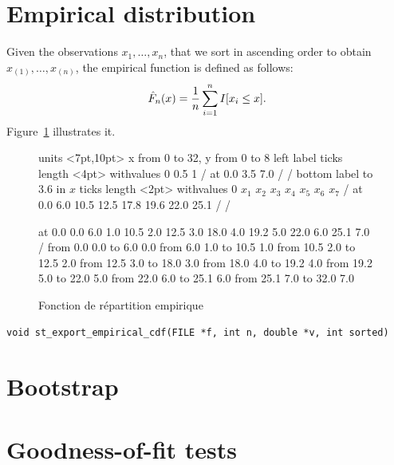 \section{Empirical distribution}

Given the observations ${x_1,\dots,x_n}$, that we sort in ascending
order to obtain ${x_{(1)},\dots,x_{(n)}}$, the empirical function
 is defined as follows:
\[
 {\hat F_n(x)} = {1\over n} \sum_{i=1}^n I[x_i \le x].
\]
Figure~\ref{fig:empirical} illustrates it.
\begin{figure}[htb]
\begin{center}
\beginpicture
\setcoordinatesystem units <7pt,10pt>
\hskip 20pt
\setplotarea x from 0 to 32, y from 0 to 8
\axis left
  label {
         \hskip 6pt } 
  ticks length <4pt> withvalues  0  0.5  1 / at  0.0  3.5  7.0 / /
\axis bottom
  label {\hbox to 3.6 in {\hfill $x$}}
  ticks length <2pt> withvalues  
     0  $x_1$ $x_2$ $x_3$ $x_4$ $x_5$ $x_6$ $x_7$  /
  at 0.0 6.0   10.5  12.5  17.8  19.6  22.0  25.1  / /

 at
  0.0 0.0
  6.0 1.0
 10.5 2.0
 12.5 3.0
 18.0 4.0
 19.2 5.0
 22.0 6.0
 25.1 7.0 /
\putrule from  0.0 0.0 to  6.0 0.0
\putrule from  6.0 1.0 to 10.5 1.0
\putrule from 10.5 2.0 to 12.5 2.0
\putrule from 12.5 3.0 to 18.0 3.0
\putrule from 18.0 4.0 to 19.2 4.0
\putrule from 19.2 5.0 to 22.0 5.0
\putrule from 22.0 6.0 to 25.1 6.0 
\putrule from 25.1 7.0 to 32.0 7.0 
\endpicture
\end{center}
\caption{Fonction de répartition empirique}
\label{fig:empirical}
\end{figure}

\begin{verbatim}
void st_export_empirical_cdf(FILE *f, int n, double *v, int sorted)
\end{verbatim}

\section{Bootstrap}

\section{Goodness-of-fit tests}

